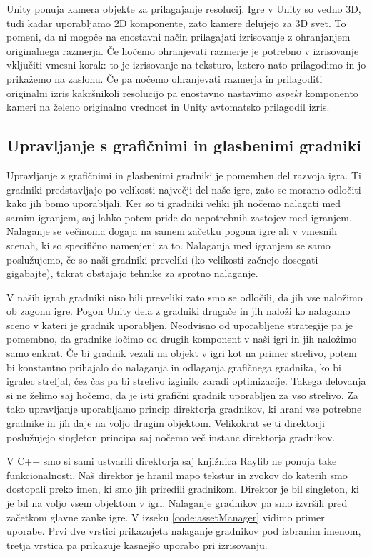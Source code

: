\documentclass[12pt,a4paper,twoside]{book}
\begin{document}
Unity ponuja kamera objekte za prilagajanje resolucij. Igre v Unity so vedno 3D, tudi kadar uporabljamo 2D komponente, zato kamere delujejo za 3D svet. To pomeni, da ni mogoče na enostavni način prilagajati izrisovanje z ohranjanjem originalnega razmerja. Če hočemo ohranjevati razmerje je potrebno v izrisovanje vključiti vmesni korak: to je izrisovanje na teksturo, katero nato prilagodimo in jo prikažemo na zaslonu. Če pa nočemo ohranjevati razmerja in prilagoditi originalni izris kakršnikoli resolucijo pa enostavno nastavimo \textit{aspekt} komponento kameri na želeno originalno vrednost in Unity avtomatsko prilagodil izris.

\subsection{Upravljanje s grafičnimi in glasbenimi gradniki}
Upravljanje z grafičnimi in glasbenimi gradniki je pomemben del razvoja igra. Ti gradniki predstavljajo po velikosti največji del naše igre, zato se moramo odločiti kako jih bomo uporabljali. Ker so ti gradniki veliki jih nočemo nalagati med samim igranjem, saj lahko potem pride do nepotrebnih zastojev med igranjem. Nalaganje se večinoma dogaja na samem začetku pogona igre ali v vmesnih scenah, ki so specifično namenjeni za to. Nalaganja med igranjem se samo poslužujemo, če so naši gradniki preveliki (ko velikosti začnejo dosegati gigabajte), takrat obstajajo tehnike za sprotno nalaganje.

V naših igrah gradniki niso bili preveliki zato smo se odločili, da jih vse naložimo ob zagonu igre. Pogon Unity dela z gradniki drugače in jih naloži ko nalagamo sceno v kateri je gradnik uporabljen. Neodvisno od uporabljene strategije pa je pomembno, da gradnike ločimo od drugih komponent v naši igri in jih naložimo samo enkrat. Če bi gradnik vezali na objekt v igri kot na primer strelivo, potem bi konstantno prihajalo do nalaganja in odlaganja grafičnega gradnika, ko bi igralec streljal, čez čas pa bi strelivo izginilo zaradi optimizacije. Takega delovanja si ne želimo saj hočemo, da je isti grafični gradnik uporabljen za vso strelivo. Za tako upravljanje uporabljamo princip direktorja gradnikov, ki hrani vse potrebne gradnike in jih daje na voljo drugim objektom. Velikokrat se ti direktorji poslužujejo singleton principa saj nočemo več instanc direktorja gradnikov.

V C++ smo si sami ustvarili direktorja saj knjižnica Raylib ne ponuja take funkcionalnosti. Naš direktor je hranil mapo tekstur in zvokov do katerih smo dostopali preko imen, ki smo jih priredili gradnikom. Direktor je bil singleton, ki je bil na voljo vsem objektom v igri. Nalaganje gradnikov pa smo izvršili pred začetkom glavne zanke igre. V izseku \ref{code:assetManager} vidimo primer uporabe. Prvi dve vrstici prikazujeta nalaganje gradnikov pod izbranim imenom, tretja vrstica pa prikazuje kasnejšo uporabo pri izrisovanju. 
\end{document}
